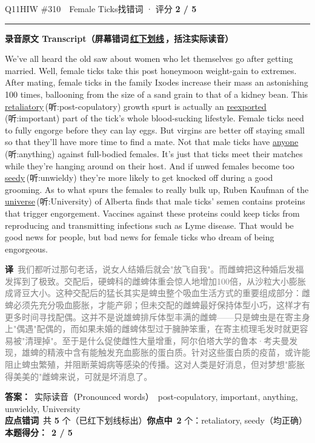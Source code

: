 \documentclass[11pt]{article}
\newcommand{\ptesub}[1]{%
  \par\needspace{2\baselineskip}\smallskip
  {\color{cAccent}\rule[-0.2ex]{3pt}{1.05em}}\hspace{6pt}%
  {\bfseries\color{cHead}#1}\par\nopagebreak\smallskip}
\newcommand{\zh}[1]{{\footnotesize\textcolor{cNote}{\textbf{译}}\ \textcolor{gray}{#1}}}
\newcommand{\hiw}[2]{{\color{cWrong}\uline{#1}}\,{\footnotesize\color{cFix}(听:#2)}} %
\begin{document}
\begin{qblock}{Q11\quad HIW \#310\ \ Female Ticks}{找错词 · 评分 \textcolor{cAccent}{\bfseries 2 / 5}}
\ptesub{录音原文 Transcript（屏幕错词\,{\color{cWrong}\uline{红下划线}}\,，括注实际读音）}
\begin{promptbox}
We've all heard the old saw about women who let themselves go after getting married. Well, female ticks take this post honeymoon weight-gain to extremes. After mating, female ticks in the family Ixodes increase their mass an astonishing 100 times, ballooning from the size of a sand grain to that of a kidney bean. This \hiw{retaliatory}{post-copulatory} growth spurt is actually an \hiw{reexported}{important} part of the tick's whole blood-sucking lifestyle. Female ticks need to fully engorge before they can lay eggs. But virgins are better off staying small so that they'll have more time to find a mate. Not that male ticks have \hiw{anyone}{anything} against full-bodied females. It's just that ticks meet their matches while they're hanging around on their host. And if unwed females become too \hiw{seedy}{unwieldy} they're more likely to get knocked off during a good grooming. As to what spurs the females to really bulk up, Ruben Kaufman of the \hiw{universe}{University} of Alberta finds that male ticks' semen contains proteins that trigger engorgement. Vaccines against these proteins could keep ticks from reproducing and transmitting infections such as Lyme disease. That would be good news for people, but bad news for female ticks who dream of being engorgeous.
\end{promptbox}
\zh{我们都听过那句老话，说女人结婚后就会"放飞自我"。而雌蜱把这种婚后发福发挥到了极致。交配后，硬蜱科的雌蜱体重会惊人地增加100倍，从沙粒大小膨胀成肾豆大小。这种交配后的猛长其实是蜱虫整个吸血生活方式的重要组成部分：雌蜱必须先充分吸血膨胀，才能产卵；但未交配的雌蜱最好保持体型小巧，这样才有更多时间寻找配偶。这并不是说雄蜱排斥体型丰满的雌蜱——只是蜱虫是在寄主身上"偶遇"配偶的，而如果未婚的雌蜱体型过于臃肿笨重，在寄主梳理毛发时就更容易被"清理掉"。至于是什么促使雌性大量增重，阿尔伯塔大学的鲁本·考夫曼发现，雄蜱的精液中含有能触发充血膨胀的蛋白质。针对这些蛋白质的疫苗，或许能阻止蜱虫繁殖，并阻断莱姆病等感染的传播。这对人类是好消息，但对梦想"膨胀得美美的"雌蜱来说，可就是坏消息了。}
\par\smallskip
\textbf{答案：}\ 实际读音（Pronounced words）\ {\color{cFix}post-copulatory, important, anything, unwieldy, University}\\
\textbf{应点错词}\ 共 \textbf{5} 个（已红下划线标出）\qquad\textbf{你点中}\ \textbf{2} 个：retaliatory, seedy（均正确）\\[2pt]\textbf{本题得分：}\ {\color{cAccent}\bfseries 2 / 5}
\end{qblock}
\end{document}
